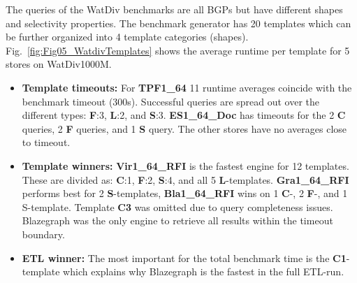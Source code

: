 The queries of the WatDiv benchmarks are all BGPs but have different shapes and selectivity properties. The benchmark generator has 20 templates which can be further organized into 4 template categories (shapes). 
Fig.~\ref{fig:Fig05_WatdivTemplates} shows the average runtime per template for 5 stores on WatDiv1000M.
\begin{itemize}
	\item \textbf{Template timeouts:} For \textbf{TPF1\_64} 11 runtime averages coincide with the benchmark timeout (300s). Successful queries are spread out over the different types: \textbf{F}:3, \textbf{L}:2, and \textbf{S}:3.
	\textbf{ES1\_64\_Doc} has timeouts for the 2 \textbf{C} queries,  2 \textbf{F} queries, and 1 \textbf{S} query. The other stores have no averages close to timeout.
	\item  \textbf{Template winners:} \textbf{Vir1\_64\_RFI} is the fastest engine for 12 templates. These are divided as: \textbf{C}:1, \textbf{F}:2, \textbf{S}:4, and all 5 \textbf{L}-templates.
	\textbf{Gra1\_64\_RFI} performs best for 2 \textbf{S}-templates, \textbf{Bla1\_64\_RFI} wins on 1 \textbf{C}-,  2 \textbf{F}-,  and 1 S-template.
	Template \textbf{C3} was omitted due to query completeness issues. Blazegraph was the only engine to retrieve all results within the timeout boundary.
	\item \textbf{ETL winner:} The most important for the total benchmark time is the \textbf{C1}-template which explains why Blazegraph is the fastest in the full ETL-run.
\end{itemize}


